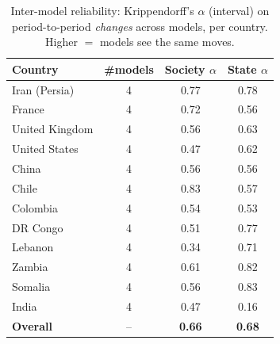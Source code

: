 \begin{table}[t]
\centering
\small
\caption{Inter-model reliability: Krippendorff's $\alpha$ (interval) on period-to-period \emph{changes} across models, per country. Higher $=$ models see the same moves.}
\label{tab:intermodel}
\begin{tabular}{lccc}
\toprule
Country & \#models & Society $\alpha$ & State $\alpha$ \\
\midrule
Iran (Persia) & 4 & 0.77 & 0.78 \\
France & 4 & 0.72 & 0.56 \\
United Kingdom & 4 & 0.56 & 0.63 \\
United States & 4 & 0.47 & 0.62 \\
China & 4 & 0.56 & 0.56 \\
Chile & 4 & 0.83 & 0.57 \\
Colombia & 4 & 0.54 & 0.53 \\
DR Congo & 4 & 0.51 & 0.77 \\
Lebanon & 4 & 0.34 & 0.71 \\
Zambia & 4 & 0.61 & 0.82 \\
Somalia & 4 & 0.56 & 0.83 \\
India & 4 & 0.47 & 0.16 \\
\midrule
\textbf{Overall} & -- & \textbf{0.66} & \textbf{0.68} \\
\bottomrule
\end{tabular}
\end{table}
